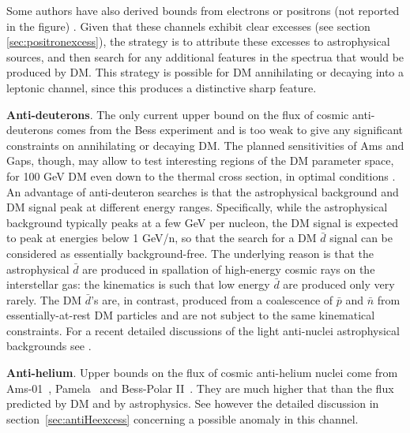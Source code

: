 Some authors have also derived bounds from electrons or positrons (not reported in the figure) \cite{epconstraints}. Given that these channels exhibit clear excesses (see section \ref{sec:positronexcess}), the strategy is to attribute these excesses to astrophysical sources, and then search for any additional features in the spectrua that would be produced by DM. This strategy is possible for DM annihilating or decaying into a leptonic channel, since this produces a distinctive sharp feature.

\smallskip

{\bf Anti-deuterons}. The only current upper bound on the flux of cosmic anti-deuterons comes from the {\sc Bess} experiment \cite{Fuke:2005it,Sakai:2023uka} and is too weak to give any significant constraints on annihilating or decaying DM. The planned sensitivities of {\sc Ams} and {\sc Gaps}, though, may allow to test interesting regions of the DM parameter space,  for 100 GeV DM even down to the thermal cross section, in optimal conditions \cite{antiD,antideuteronssearches,antiDprospects}. 
An advantage of anti-deuteron searches is that the astrophysical background and DM signal peak at different energy ranges. Specifically, while the astrophysical background typically peaks at a few GeV per nucleon, the DM signal is expected to peak at energies below 1 GeV/n,  so that the search for a DM $\bar d$ signal can be considered as essentially background-free. 
The underlying reason is that the astrophysical $\bar d$ are produced in spallation of high-energy cosmic rays on the interstellar gas: the kinematics is such that low energy $\bar d$ are produced only very rarely. The DM $\bar d$'s are, in contrast, produced from a coalescence of $\bar p$ and $\bar n$ from essentially-at-rest DM particles and are not subject to the same kinematical constraints. For a recent detailed discussions of the light anti-nuclei astrophysical backgrounds see \cite{antinucleibkg}. 

\smallskip

{\bf Anti-helium}. Upper bounds on the flux of cosmic anti-helium nuclei come from {\sc Ams-01}~\cite{AMS:1999tha}, {\sc Pamela}~\cite{Mayorov:2011zz} and {\sc Bess-Polar II}~\cite{Abe:2012tz}. They are much higher that than the flux predicted by DM and by astrophysics. See however the detailed discussion in section~\ref{sec:antiHeexcess} concerning a possible anomaly in this channel.

\smallskip

